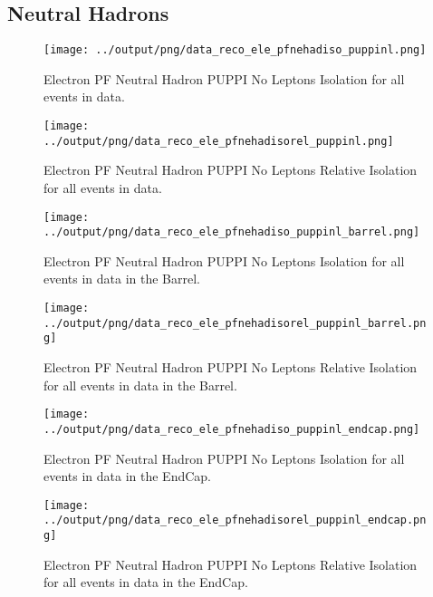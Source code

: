 \documentclass[11pt]{book}
\begin{document}
\subsection{Neutral Hadrons}
\begin{figure}[htb]
\centering
\texttt{[image: ../output/png/data\_reco\_ele\_pfnehadiso\_puppinl.png]}
\caption{Electron PF Neutral Hadron PUPPI No Leptons Isolation for all events in data.}
\label{fig:data_ele_pfnehadiso_puppinl}
\end{figure}

\begin{figure}[htb]
\centering
\texttt{[image: ../output/png/data\_reco\_ele\_pfnehadisorel\_puppinl.png]}
\caption{Electron PF Neutral Hadron PUPPI No Leptons Relative Isolation for all events in data.}
\label{fig:data_ele_pfnehadisorel_puppinl}
\end{figure}

\begin{figure}[htb]
\centering
\texttt{[image: ../output/png/data\_reco\_ele\_pfnehadiso\_puppinl\_barrel.png]}
\caption{Electron PF Neutral Hadron PUPPI No Leptons Isolation for all events in data in the Barrel.}
\label{fig:data_ele_pfnehadiso_puppinl_barrel}
\end{figure}

\begin{figure}[htb]
\centering
\texttt{[image: ../output/png/data\_reco\_ele\_pfnehadisorel\_puppinl\_barrel.png]}
\caption{Electron PF Neutral Hadron PUPPI No Leptons Relative Isolation for all events in data in the Barrel.}
\label{fig:data_ele_pfnehadisorel_puppinl_barrel}
\end{figure}

\begin{figure}[htb]
\centering
\texttt{[image: ../output/png/data\_reco\_ele\_pfnehadiso\_puppinl\_endcap.png]}
\caption{Electron PF Neutral Hadron PUPPI No Leptons Isolation for all events in data in the EndCap.}
\label{fig:data_ele_pfnehadiso_puppinl_endcap}
\end{figure}

\begin{figure}[htb]
\centering
\texttt{[image: ../output/png/data\_reco\_ele\_pfnehadisorel\_puppinl\_endcap.png]}
\caption{Electron PF Neutral Hadron PUPPI No Leptons Relative Isolation for all events in data in the EndCap.}
\label{fig:data_ele_pfnehadisorel_puppinl_endcap}
\end{figure}
\clearpage
\end{document}
